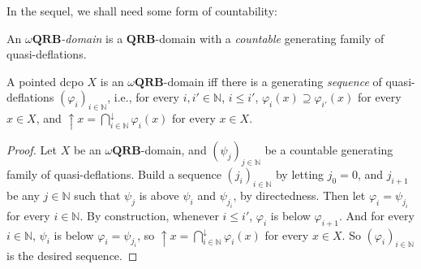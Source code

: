 \documentclass{LMCS}
\newcommand\nat{\mathbb{N}}
\newcommand\upc{\mathop{\uparrow}\nolimits}
\newcommand\QRB{\mathbf{QRB}}
\begin{document}
In the sequel, we shall need some form of countability:
\begin{defi} \label{defn:omega:qrb}
  An {\em $\omega\QRB$-domain\/} is a $\QRB$-domain with a {\em
    countable\/} generating family of quasi-deflations.
\end{defi}

\begin{prop}
  \label{prop:omega:qrb}
  A pointed dcpo $X$ is an $\omega\QRB$-domain iff there is a
  generating {\em sequence\/} of quasi-deflations ${(\varphi_i)}_{i
    \in \nat}$, i.e., for every $i,i' \in \nat$, $i \leq i'$,
  $\varphi_i (x) \supseteq \varphi_{i'} (x)$ for every $x \in X$, and
  $\upc x = \bigcap_{i \in \nat}^\downarrow {\varphi_i (x)}$ for every
  $x \in X$.
\end{prop}
\begin{proof}
  Let $X$ be an $\omega\QRB$-domain, and ${(\psi_j)}_{j \in \nat}$ be
  a countable generating family of quasi-deflations.  Build a sequence
  ${(j_i)}_{i \in \nat}$ by letting $j_0 = 0$, and $j_{i+1}$ be any $j
  \in \nat$ such that $\psi_j$ is above $\psi_i$ and $\psi_{j_i}$, by
  directedness.  Then let $\varphi_i = \psi_{j_i}$ for every $i \in
  \nat$.  By construction, whenever $i \leq i'$, $\varphi_i$ is below
  $\varphi_{i+1}$.  And for every $i \in \nat$, $\psi_i$ is below
  $\varphi_i = \psi_{j_i}$, so $\upc x = \bigcap_{i \in
    \nat}^\downarrow {\varphi_i (x)}$ for every $x \in X$.  So
  ${(\varphi_i)}_{i \in \nat}$ is the desired sequence.
\end{proof}
\end{document}
